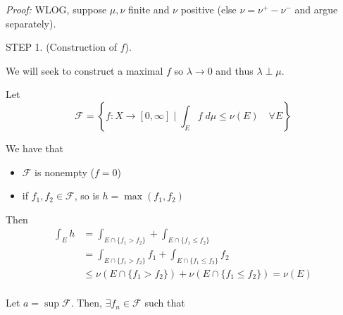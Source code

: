 \documentclass[12pt]{report}
\newcommand{\Fc}{\mathcal{F}}
\renewcommand{\L}{\mathcal{L}}
\newcommand{\st}{\text{ s.t. }}
\newenvironment*{tbox}[2][gray]{
    \begin{tcolorbox}[
        parbox=false,
        colback=#1!5!white,
        colframe=#1!75!black,
        breakable,
        title={#2}
    ]}
    {\end{tcolorbox}}
\begin{document}
        \begin{tbox}{\textbf{Lebesgue-Radon-Nikodym Theorem:} Let $\nu$ be a $\sigma$-finite signed measure and $\mu$ be a $\sigma$-finite positive measure. Then there exists a unique (a.e. in $\mu$) $f \in \L^1_{\mu}$ such that 
            \[\nu = \lambda + f\; d\mu \quad \st\quad  \lambda \perp \mu\]}
            \emph{Proof:} WLOG, suppose $\mu, \nu$ finite and $\nu$ positive (else $\nu = \nu^+ - \nu^-$ and argue separately).

        
            STEP 1. (Construction of $f$). 
            
            We will seek to construct a maximal $f$ so $\lambda \to 0$ and thus $\lambda \perp \mu$. 

            Let 
            \[\Fc = \left\{f: X \to [0, \infty] \; \bigg\vert \; \int_E f\; d\mu \leq \nu(E) \quad \forall E\right\}\]

            We have that 
            \begin{itemize}
                \item $\Fc$ is nonempty ($f = 0$) 
                \item if $f_1, f_2 \in \Fc$, so is $h = \max(f_1, f_2)$
            \end{itemize} 

            Then 
            \begin{align*}
                \int_E h &= \int_{E\cap \{f_1 > f_2\}} + \int_{E\cap\{f_1 \leq f_2\}}\\ 
                    &= \int_{E \cap \{f_1 > f_2\}} f_1 + \int_{E \cap \{f_1 \leq f_2\}} f_2\\ 
                    &\leq \nu(E \cap \{f_1 > f_2\}) + \nu(E \cap \{f_1 \leq f_2\}) = \nu(E)\\
            \end{align*}

            Let $a = \sup \Fc$. Then, $\exists f_n \in \Fc$ such that 
        \end{tbox}
\end{document}
